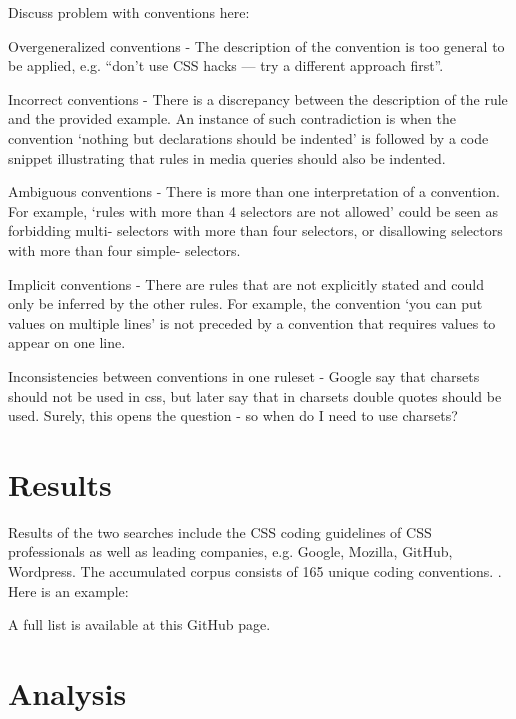 \documentclass[parskip=full]{uvamscse}
\begin{document}
Discuss problem with conventions here: 
\begin{description}

\item Overgeneralized conventions - The description of the convention is too general to be applied,
e.g. ``don’t use CSS hacks — try a different approach first''.

\item Incorrect conventions - There is a discrepancy between the description of the rule and the
provided example. An instance of such contradiction is when the convention ‘nothing but declarations
should be indented’ is followed by a code snippet illustrating that rules in media queries should
also be indented.

\item Ambiguous conventions - There is more than one interpretation of a convention. For example,
‘rules with more than 4 selectors are not allowed’ could be seen as forbidding multi- selectors with
more than four selectors, or disallowing selectors with more than four simple- selectors.

\item Implicit conventions - There are rules that are not explicitly stated and could only be
inferred by the other rules. For example, the convention ‘you can put values on multiple lines’ is
not preceded by a convention that requires values to appear on one line.

\item Inconsistencies between conventions in one ruleset - Google say that charsets should not be
used in css, but later say that in charsets double quotes should be used. Surely, this opens the
question - so when do I need to use charsets? 

\end{description}

\section{Results}

Results of the two searches include the CSS coding guidelines of CSS professionals as well as
leading companies, e.g. Google, Mozilla, GitHub, Wordpress. The accumulated corpus consists of 165
unique coding conventions. . Here is an example:

A full list is available at this GitHub page.

\section{Analysis}
\end{document}
